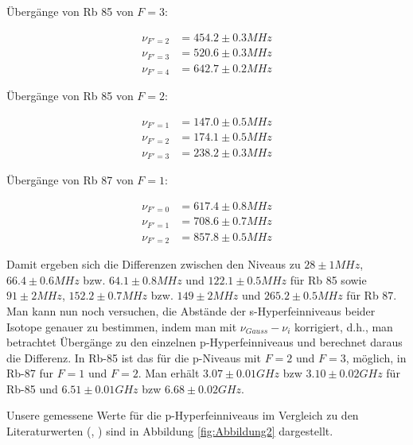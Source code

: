 \documentclass[a4paper,parskip]{scrartcl}
\begin{document}
Übergänge von Rb 85 von $F=3$:

\begin{align*}
\nu_{F'=2} &= 454.2 \pm 0.3 MHz \\
\nu_{F'=3} &= 520.6 \pm 0.3 MHz \\
\nu_{F'=4} &= 642.7 \pm 0.2 MHz  
\end{align*}

Übergänge von Rb 85 von $F=2$:

\begin{align*}
\nu_{F'=1} &= 147.0 \pm 0.5 MHz \\
\nu_{F'=2} &= 174.1 \pm 0.5 MHz \\
\nu_{F'=3} &= 238.2 \pm 0.3 MHz  
\end{align*}

Übergänge von Rb 87 von $F=1$:

\begin{align*}
\nu_{F'=0} &= 617.4 \pm 0.8 MHz \\
\nu_{F'=1} &= 708.6 \pm 0.7 MHz \\
\nu_{F'=2} &= 857.8 \pm 0.5 MHz  
\end{align*}

Damit ergeben sich die Differenzen zwischen den Niveaus zu $28 \pm 1 MHz$, $66.4 \pm 0.6MHz$ bzw. $64.1 \pm 0.8 MHz$ und $122.1 \pm 0.5 MHz$ für Rb 85 sowie $91 \pm 2 MHz$, $152.2 \pm 0.7 MHz$ bzw. $149 \pm 2 MHz$ und  $265.2 \pm 0.5 MHz$ für Rb 87.\\

Man  kann nun noch versuchen, die Abstände der s-Hyperfeinniveaus beider Isotope genauer zu bestimmen, indem man mit $\nu_{Gauss} - \nu_i$ korrigiert, d.h., man betrachtet Übergänge zu den einzelnen p-Hyperfeinniveaus und berechnet daraus die Differenz. In Rb-85 ist das für die p-Niveaus mit $F=2$ und $F=3$, möglich, in Rb-87 fur $F=1$ und $F=2$. Man erhält
$3.07 \pm 0.01 GHz$ bzw $3.10 \pm 0.02 GHz$ für Rb-85 und $6.51 \pm 0.01 GHz$ bzw $6.68 \pm 0.02 GHz$.

Unsere gemessene Werte für die p-Hyperfeinniveaus im Vergleich zu den Literaturwerten (\cite{Ref:1}, \cite{Ref:2}) sind in Abbildung \ref{fig:Abbildung2} dargestellt.
\end{document}
